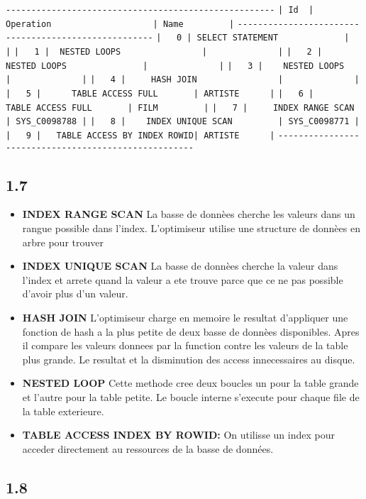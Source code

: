\documentclass{article}
\begin{document}
\verb!-----------------------------------------------------!
\verb!| Id  | Operation                    | Name         |!
\verb!-----------------------------------------------------!
\verb!|   0 | SELECT STATEMENT             |              |!
\verb!|   1 |  NESTED LOOPS                |              |!
\verb!|   2 |   NESTED LOOPS               |              |!
\verb!|   3 |    NESTED LOOPS              |              |!
\verb!|   4 |     HASH JOIN                |              |!
\verb!|   5 |      TABLE ACCESS FULL       | ARTISTE      |!
\verb!|   6 |      TABLE ACCESS FULL       | FILM         |!
\verb!|   7 |     INDEX RANGE SCAN         | SYS_C0098788 |!
\verb!|   8 |    INDEX UNIQUE SCAN         | SYS_C0098771 |!
\verb!|   9 |   TABLE ACCESS BY INDEX ROWID| ARTISTE      |!
\verb!-----------------------------------------------------!

\subsection{1.7}

\begin{itemize} 
\item \textbf{INDEX RANGE SCAN} La basse de donnèes cherche les valeurs dans un rangue
possible dans l'index. L'optimiseur utilise une structure de donnèes en arbre pour trouver 
\item \textbf{INDEX UNIQUE SCAN} La basse de donnèes cherche la valeur dans l'index
et arrete quand la valeur a ete trouve parce que ce ne pas possible d'avoir plus 
d'un valeur.
\item \textbf{HASH JOIN} L'optimiseur charge en memoire le resultat d'appliquer une
fonction de hash a la plus petite de deux basse de donnèes disponibles. Apres il compare
les valeurs donnees par la function contre les valeurs de la table plus grande.
Le resultat et la disminution des access innecessaires au disque.

\item \textbf{NESTED LOOP} Cette methode cree deux boucles un pour la table grande et
l'autre pour la table petite. Le boucle interne s'execute pour chaque file de la table
exterieure. 
\item \textbf{TABLE ACCESS INDEX BY ROWID:} On utilisse un index pour acceder directement
au ressources de la basse de données.
\end{itemize} 


\subsection{1.8}
\end{document}
